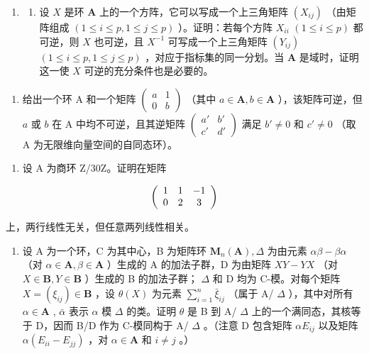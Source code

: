 \begin{enumerate}
\def\labelenumi{\arabic{enumi}.}
\setcounter{enumi}{1}
\tightlist
\item
  \begin{enumerate}
  \def\labelenumii{(\alph{enumii})}
  \tightlist
  \item
    设 \(X\) 是环 \(\mathbf{A}\) 上的一个方阵，它可以写成一个上三角矩阵 \((X_{ij})\) （由矩阵组成 \((1 \leqslant i \leqslant p, 1 \leqslant j \leqslant p)\) ）。证明：若每个方阵 \(X_{ii}\) \((1 \leqslant i \leqslant p)\) 都可逆，则 \(X\) 也可逆，且 \(X^{-1}\) 可写成一个上三角矩阵 \((Y_{ij})\) \((1 \leqslant i \leqslant p, 1 \leqslant j \leqslant p)\) ，对应于指标集的同一分划。当 \(\mathbf{A}\) 是域时，证明这一使 \(X\) 可逆的充分条件也是必要的。
  \end{enumerate}
\end{enumerate}

\begin{enumerate}
\def\labelenumi{(\alph{enumi})}
\setcounter{enumi}{1}
\tightlist
\item
  给出一个环 A 和一个矩阵 \(\begin{pmatrix} a & 1 \\ 0 & b \end{pmatrix}\) （其中 \(a \in \mathbf{A}, b \in \mathbf{A}\) ），该矩阵可逆，但 \(a\) 或 \(b\) 在 A 中均不可逆，且其逆矩阵 \(\begin{pmatrix} a' & b' \\ c' & d' \end{pmatrix}\) 满足 \(b' \neq 0\) 和 \(c' \neq 0\) （取 A 为无限维向量空间的自同态环）。
\end{enumerate}

\begin{enumerate}
\def\labelenumi{\arabic{enumi}.}
\setcounter{enumi}{2}
\tightlist
\item
  设 A 为商环 Z/30Z。证明在矩阵
\end{enumerate}

\[
\left( \begin{array}{c c c} 1 & 1 & - 1 \\ 0 & 2 & 3 \end{array} \right)
\]

上，两行线性无关，但任意两列线性相关。

\begin{enumerate}
\def\labelenumi{\arabic{enumi}.}
\setcounter{enumi}{3}
\tightlist
\item
  设 A 为一个环，C 为其中心，B 为矩阵环 \(\mathbf{M}_n(\mathbf{A}), \Delta\) 为由元素 \(\alpha\beta - \beta\alpha\) （对 \(\alpha \in \mathbf{A}, \beta \in \mathbf{A}\) ）生成的 A 的加法子群，D 为由矩阵 \(XY - YX\) （对 \(X \in \mathbf{B}, Y \in \mathbf{B}\) ）生成的 B 的加法子群； \(\Delta\) 和 D 均为 C-模。对每个矩阵 \(X = (\xi_{ij}) \in \mathbf{B}\) ，设 \(\theta(X)\) 为元素 \(\sum_{i=1}^{n} \bar{\xi}_{ij}\) （属于 A/ \(\Delta\) ），其中对所有 \(\alpha \in \mathbf{A}\) , \(\bar{\alpha}\) 表示 \(\alpha\) 模 \(\Delta\) 的类。证明 \(\theta\) 是 B 到 A/ \(\Delta\) 上的一个满同态，其核等于 D，因而 B/D 作为 C-模同构于 A/ \(\Delta\) 。（注意 D 包含矩阵 \(\alpha E_{ij}\) 以及矩阵 \(\alpha(E_{ii} - E_{jj})\) ，对 \(\alpha \in \mathbf{A}\) 和 \(i \neq j\) 。）
\end{enumerate}

